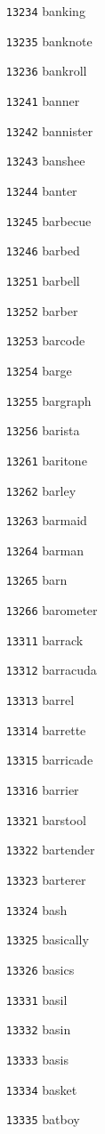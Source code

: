 \documentclass[twoside,11pt]{article}
\begin{document}
\begin{multicols}{5}
\begin{enumerate}
\item[\texttt{13234}] banking
\item[\texttt{13235}] banknote
\item[\texttt{13236}] bankroll
\item[\texttt{13241}] banner
\item[\texttt{13242}] bannister
\item[\texttt{13243}] banshee
\item[\texttt{13244}] banter
\item[\texttt{13245}] barbecue
\item[\texttt{13246}] barbed
\item[\texttt{13251}] barbell
\item[\texttt{13252}] barber
\item[\texttt{13253}] barcode
\item[\texttt{13254}] barge
\item[\texttt{13255}] bargraph
\item[\texttt{13256}] barista
\item[\texttt{13261}] baritone
\item[\texttt{13262}] barley
\item[\texttt{13263}] barmaid
\item[\texttt{13264}] barman
\item[\texttt{13265}] barn
\item[\texttt{13266}] barometer
\item[\texttt{13311}] barrack
\item[\texttt{13312}] barracuda
\item[\texttt{13313}] barrel
\item[\texttt{13314}] barrette
\item[\texttt{13315}] barricade
\item[\texttt{13316}] barrier
\item[\texttt{13321}] barstool
\item[\texttt{13322}] bartender
\item[\texttt{13323}] barterer
\item[\texttt{13324}] bash
\item[\texttt{13325}] basically
\item[\texttt{13326}] basics
\item[\texttt{13331}] basil
\item[\texttt{13332}] basin
\item[\texttt{13333}] basis
\item[\texttt{13334}] basket
\item[\texttt{13335}] batboy

\end{enumerate}
\end{multicols}
\end{document}
